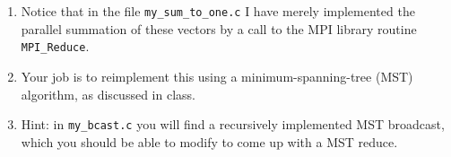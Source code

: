 \documentclass[10pt]{article}
\begin{document}
\begin{enumerate}
\begin{enumerate}
\[\begin{array}{r}
1.0100 \\
\vdots
9.0100
\end{array}
\right),  \quad
%
\left( \begin{array}{r}
0.0020 \\
1.0020 \\
\vdots
9.0020
\end{array}
\right),  \quad
\mbox{etc.}
\]
on processors $ 0, 1, 2, \ldots $.
\item
The output is the sum of these vectors, gather to the root (in this
case processor 0):
\[
\left( \begin{array}{c}
0.01234 \\
5.01234 \\
\vdots \\
45.01234
\end{array}
\right)
\]
\end{enumerate}
\item
Notice that in the file {\tt my\_sum\_to\_one.c} I have merely
implemented the parallel summation of these vectors by a call
to the MPI library routine {\tt MPI\_Reduce}.
\item
Your job is to reimplement this using a minimum-spanning-tree
(MST) algorithm, as discussed in class.
\item
Hint: in {\tt my\_bcast.c} you will find a recursively implemented
MST broadcast, which you should be able to modify to come up
with a MST reduce.
\end{enumerate}
\end{document}
